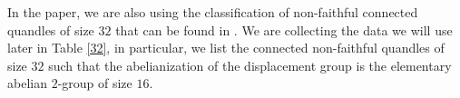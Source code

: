 \documentclass[a4paper, english, 9pt]{amsart}
\theoremstyle{plain}
\theoremstyle{definition}
\def\con{\mathrm{Con}}
\begin{document}
In the paper, we are also using the classification of non-faithful connected quandles of size $32$ that can be found in \cite{RIG}. We are collecting the data we will use later in Table \ref{32}, in particular, we list the connected non-faithful quandles of size $32$ such that the abelianization of the displacement group is the elementary abelian $2$-group of size $16$.

\end{document}
